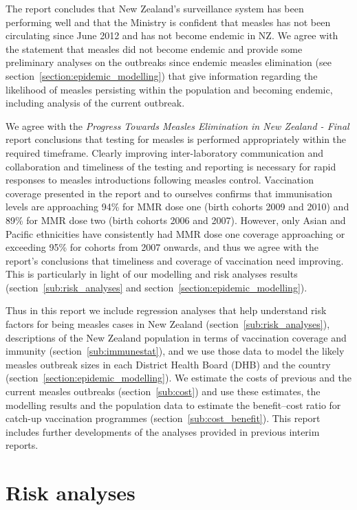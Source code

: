 \documentclass{article}
\begin{document}
The report concludes that New Zealand's surveillance system has been performing well and that the Ministry is confident that measles has not been circulating since June 2012 and has not become endemic in NZ. We agree with the statement that measles did not become endemic and provide some preliminary analyses on the outbreaks since endemic measles elimination (see section~\autoref{section:epidemic_modelling}) that give information regarding the likelihood of measles persisting within the population and becoming endemic, including analysis of the current outbreak.

We agree with the \emph {Progress Towards Measles Elimination in New Zealand - Final} report conclusions that testing for measles is performed appropriately within the required timeframe. Clearly improving inter-laboratory communication and collaboration and timeliness of the testing and reporting is necessary for rapid responses to measles introductions following measles control. Vaccination coverage presented in the report and to ourselves confirms that immunisation levels are approaching 94\% for MMR dose one (birth cohorts 2009 and 2010) and 89\% for MMR dose two (birth cohorts 2006 and 2007). However, only Asian and Pacific ethnicities have consistently had MMR dose one coverage approaching or exceeding 95\% for cohorts from 2007 onwards, and thus we agree with the report's conclusions that timeliness and coverage of vaccination need improving. This is particularly in light of our modelling and risk analyses results (section~\autoref{sub:risk_analyses} and section~\autoref{section:epidemic_modelling}).

Thus in this report we include regression analyses that help understand risk factors for being measles cases in New Zealand (section~\autoref{sub:risk_analyses}), descriptions of the New Zealand population in terms of vaccination coverage and immunity (section~\autoref{sub:immunestat}), and we use those data to model the likely measles outbreak sizes in each District Health Board (DHB) and the country (section~\autoref{section:epidemic_modelling}). We estimate the costs of previous and the current measles outbreaks (section~\autoref{sub:cost}) and use these estimates, the modelling results and the population data to estimate the benefit--cost ratio for catch-up vaccination programmes (section~\autoref{sub:cost_benefit}). This report includes further developments of the analyses provided in previous interim reports.

\section{Risk analyses}
\label{sub:risk_analyses}
\end{document}
